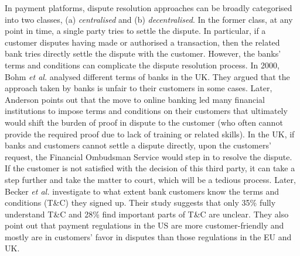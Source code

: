 In payment platforms,  dispute resolution approaches can be broadly categorised into two classes, (a) \emph{centralised} and (b) \emph{decentralised}. In the former class,  at any point in time, a single party tries to settle the dispute. In particular, if a customer  disputes having made or authorised a transaction, then the related bank tries directly settle the dispute with the customer.  However, the banks' terms and conditions can complicate the dispute resolution process. In 2000, Bohm \textit{et al.} \cite{BohmBG00} analysed different terms of banks in the UK. They argued that the approach taken by banks is unfair to their customers in some cases. Later,  Anderson  \cite{anderson2007closing} points out that the move to online banking led many financial institutions to impose terms and conditions on their customers that ultimately would shift the burden of proof in dispute to the customer (who often cannot  provide the required proof due to lack of training or related skills). In the UK, if banks and customers cannot settle a dispute directly, upon the customers' request, the  Financial Ombudsman Service would step in to resolve the dispute. If the customer is  not satisfied with the decision of this third party, it can take a step further and take  the matter to court, which will be  a tedious process. Later,  Becker \textit{et al.} \cite{BeckerHAABMSS17} investigate to what extent bank customers know the terms and conditions (T\&C) they  signed up. Their study suggests that only 35\% fully understand T\&C and  28\% find important parts of T\&C are unclear. They also point out that  payment regulations in the US are more customer-friendly and mostly are in  customers' favor in disputes than those regulations in the EU and UK. 


